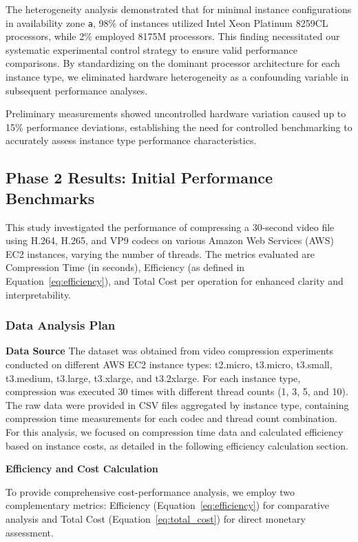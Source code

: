 \documentclass[conference]{IEEEtran}
\begin{document}
	The heterogeneity analysis demonstrated that for minimal instance configurations in availability zone \texttt{a}, 98\% of instances utilized Intel Xeon Platinum 8259CL processors, while 2\% employed 8175M processors. This finding necessitated our systematic experimental control strategy to ensure valid performance comparisons. By standardizing on the dominant processor architecture for each instance type, we eliminated hardware heterogeneity as a confounding variable in subsequent performance analyses.
	
	Preliminary measurements showed uncontrolled hardware variation caused up to 15\% performance deviations, establishing the need for controlled benchmarking to accurately assess instance type performance characteristics.
	
	\subsection{Phase 2 Results: Initial Performance Benchmarks}
	\label{results-phase2}
	
	This study investigated the performance of compressing a 30-second video file using H.264, H.265, and VP9 codecs on various Amazon Web Services (AWS) EC2 instances, varying the number of threads. The metrics evaluated are Compression Time (in seconds), Efficiency (as defined in Equation~\ref{eq:efficiency}), and Total Cost per operation for enhanced clarity and interpretability.
	
	\subsubsection{Data Analysis Plan}
	
	\textbf{Data Source}
	The dataset was obtained from video compression experiments conducted on different AWS EC2 instance types: t2.micro, t3.micro, t3.small, t3.medium, t3.large, t3.xlarge, and t3.2xlarge. For each instance type, compression was executed 30 times with different thread counts (1, 3, 5, and 10). The raw data were provided in CSV files aggregated by instance type, containing compression time measurements for each codec and thread count combination. For this analysis, we focused on compression time data and calculated efficiency based on instance costs, as detailed in the following efficiency calculation section.
	
	\textbf{Efficiency and Cost Calculation}
	\label{efficiency-calculation}
	
	To provide comprehensive cost-performance analysis, we employ two complementary metrics: Efficiency (Equation~\ref{eq:efficiency}) for comparative analysis and Total Cost (Equation~\ref{eq:total_cost}) for direct monetary assessment.
	
\end{document}
